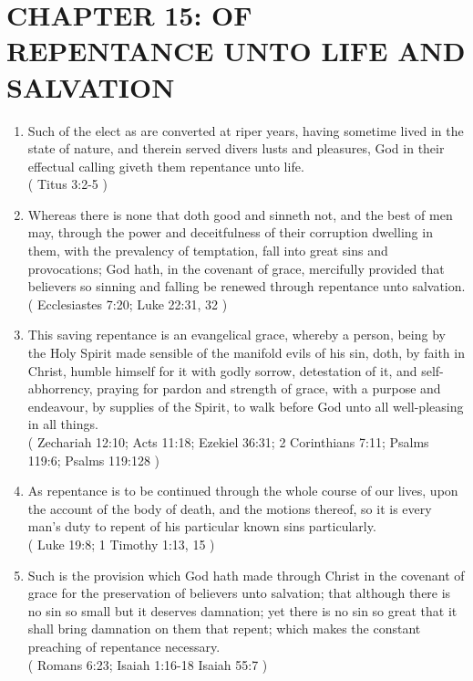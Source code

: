 \documentclass[12pt,a4paper]{book}
\begin{document}
\chapter{CHAPTER 15: OF REPENTANCE UNTO LIFE AND SALVATION}
\label{ch-rep-sal}
\begin{enumerate}
\item Such of the elect as are converted at riper years, having sometime lived in the state of nature, and therein served divers lusts and pleasures, God in their effectual calling giveth them repentance unto life.\\
( Titus 3:2-5 )
\item Whereas there is none that doth good and sinneth not, and the best of men may, through the power and deceitfulness of their corruption dwelling in them, with the prevalency of temptation, fall into great sins and provocations; God hath, in the covenant of grace, mercifully provided that believers so sinning and falling be renewed through repentance unto salvation.\\
( Ecclesiastes 7:20; Luke 22:31, 32 )
\item This saving repentance is an evangelical grace, whereby a person, being by the Holy Spirit made sensible of the manifold evils of his sin, doth, by faith in Christ, humble himself for it with godly sorrow, detestation of it, and self-abhorrency, praying for pardon and strength of grace, with a purpose and endeavour, by supplies of the Spirit, to walk before God unto all well-pleasing in all things.\\
( Zechariah 12:10; Acts 11:18; Ezekiel 36:31; 2 Corinthians 7:11; Psalms 119:6; Psalms 119:128 )
\item As repentance is to be continued through the whole course of our lives, upon the account of the body of death, and the motions thereof, so it is every man's duty to repent of his particular known sins particularly.\\
( Luke 19:8; 1 Timothy 1:13, 15 )
\item Such is the provision which God hath made through Christ in the covenant of grace for the preservation of believers unto salvation; that although there is no sin so small but it deserves damnation; yet there is no sin so great that it shall bring damnation on them that repent; which makes the constant preaching of repentance necessary.\\
( Romans 6:23; Isaiah 1:16-18 Isaiah 55:7 )
\end{enumerate}
\end{document}
